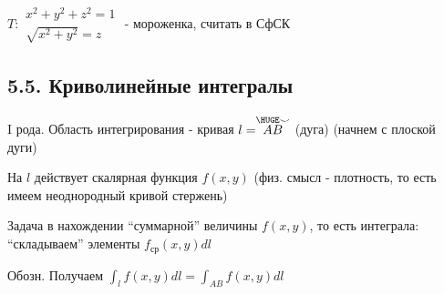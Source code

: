 \documentclass[12pt]{article}
\begin{document}
    \Lab $T: \begin{matrix}x^2 + y^2 + z^2 = 1 \\ \sqrt{x^2 + y^2} = z\end{matrix}$ - мороженка, считать в СфСК


    \subsection{5.5. Криволинейные интегралы}

    \hypertarget{curvilinearintegraloffirstkind}{}

    I рода. Область интегрирования - кривая $l = \stackrel{\HUGE\smile}{AB}$ (дуга) (начнем с плоской дуги)

    На $l$ действует скалярная функция $f(x, y)$ (физ. смысл - плотность, то есть имеем неоднородный кривой стержень)

    Задача в нахождении \enquote{суммарной} величины $f(x, y)$, то есть интеграла: \enquote{складываем} элементы $f_{\text{ср}}(x, y) dl$


    Обозн. Получаем $\int_l f(x, y)dl = \int_{AB} f(x, y)dl$
\end{document}
